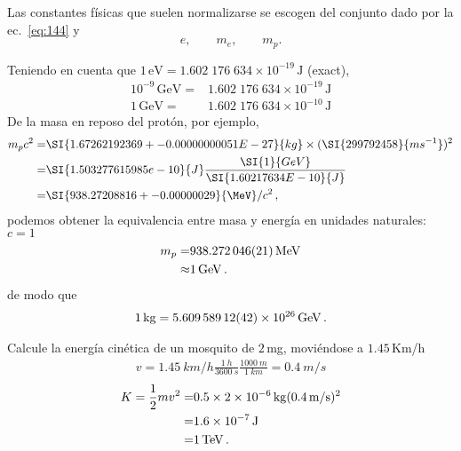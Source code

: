 Las constantes físicas que suelen normalizarse se escogen del conjunto dado por la ec.~\eqref{eq:144} y
\begin{equation}
  \label{eq:145}
  e,\qquad m_e,\qquad m_p.
\end{equation}
\begin{frame}
Teniendo en cuenta que $1\,\text{eV}=1.602\;176\;634\times10^{-19}\,\text{J}$ (exact), 
\begin{align}
  10^{-9}\,\text{GeV}=&1.602\;176\;634\times10^{-19}\,\text{J}\nonumber\\
  1\,\text{GeV}=&1.602\;176\;634\times10^{-10}\,\text{J}
\end{align}
De la masa en reposo del protón, por ejemplo, 
\begin{align*}
  m_pc^2=&\SI{1.67262192369 +- 0.00000000051E-27}{kg}\times (\SI{299792458}{ms^{-1}})^2\nonumber\\
  =&\SI{1.503277615985e-10}{J}\frac{\SI{1}{GeV}}{\SI{1.60217634E-10}{J}}\nonumber\\
  =&\SI{938.27208816+-0.00000029}{\MeV}/c^2\,,
\end{align*}
podemos obtener la equivalencia entre masa y energía en unidades naturales: $c=1$
\begin{align}
m_p=&\SI{938.272046+-0.000021}{MeV}\nonumber\\
  \approx& \SI{1}{GeV}\,.
\end{align}
de modo que
\begin{align}
  \SI{1}{kg}=\SI{5.60958912 +- 0.00000042E26}{GeV}\,.
\end{align}

\begin{example}
  Calcule la energía cinética de un mosquito de $2\,$mg, moviéndose a $1.45\,$Km/h
  \begin{align}
    v= \SI{1.45}{km/h}\frac{\SI{1}{h}}{\SI{3600}{s}}\frac{\SI{1000}{m}}{\SI{1}{km}}=\SI{0.4}{m/s}  
\end{align}
\begin{align}
  K=\frac{1}{2}mv^2=&0.5\times \SI{2E-6}{kg}(\SI{0.4}{m/s})^2 \nonumber\\
                   =&\SI{1.6E-7}{J}\nonumber\\
                   =&\SI{1}{TeV}\,.
\end{align}

\end{example}


\end{frame}

